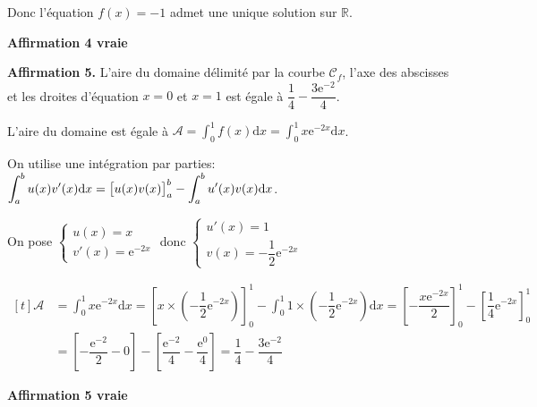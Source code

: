 \documentclass[10pt]{article}
\providecommand{\R}{\mathbb{R}}
\providecommand{\e}{{\mathrm{e}}}
\renewcommand{\d}{{\mathrm{d}}}
\providecommand{\ds}{\displaystyle}
\begin{document}
Donc l'équation $f(x)=-1$ admet une unique solution sur $\R$.

\hfill \textbf{Affirmation 4 vraie}

\bigskip

\textbf{Affirmation 5.} L'aire du domaine délimité par la courbe $\mathcal{C}_{f}$, l'axe des abscisses et les droites d'équation $x=0$ et $x=1$ est égale à $\dfrac{1}{4}-\dfrac{3 \e^{-2}}{4}$.

L'aire du domaine est égale à $\mathcal{A} = \ds\int_{0}^{1}f(x) \d x = \ds \int_{0}^{1} x \e^{-2x} \d x$.

On utilise une intégration par parties:
$\ds\int_{a}^{b} u(x)v'(x)\d x =\left [ u(x)v(x)\strut \right ]_{a}^{b} -\int_{a}^{b} u'(x) v(x) \d x$.

On pose
$\left \{
\begin{array}{l}
u(x)=x\\
v'(x)=\e^{-2x}
\end{array}
\right .$
donc
$\left \{
\begin{array}{l}
u'(x)=1\\
v(x)= -\dfrac{1}{2} \e^{-2x}
\end{array}
\right .$

$\begin{aligned}[t]
\mathcal{A}
& = \ds \int_{0}^{1} x \e^{-2x} \d x
 = \left [x\times \left ( -\dfrac{1}{2}\e^{-2x} \right ) \right ]_{0}^{1}- \ds\int_{0}^{1} 1\times \left ( -\dfrac{1}{2}\e^{-2x} \right ) \d x
 = \left [-\dfrac{x\e^{-2x} }{2} \right ]_{0}^{1}- \left [ \dfrac{1}{4}\e^{-2x} \right ]_{0}^{1}\\
& = \left [ - \dfrac{\e^{-2}}{2} - 0 \right  ] - \left [ \dfrac{\e^{-2}}{4}  - \dfrac{\e^{0}}{4}\right ]
= \dfrac{1}{4} - \dfrac{3\e^{-2}}{4}
\end{aligned}$

\hfill \textbf{Affirmation 5 vraie}

\bigskip
\end{document}
